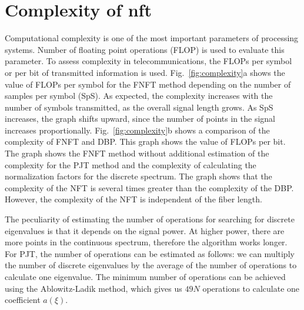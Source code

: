 \section{Complexity of \acrlong{nft}}


Computational complexity is one of the most important parameters of processing systems. Number of floating point operations (FLOP) is used to evaluate this parameter. To assess complexity in telecommunications, the FLOPs per symbol or per bit of transmitted information is used. Fig.~\ref{fig:complexity}a shows the value of FLOPs per symbol for the FNFT method depending on the number of samples per symbol (SpS). As expected, the complexity increases with the number of symbols transmitted, as the overall signal length grows. As SpS increases, the graph shifts upward, since the number of points in the signal increases proportionally. Fig.~\ref{fig:complexity}b shows a comparison of the complexity of FNFT and DBP. This graph shows the value of FLOPs per bit. The graph shows the FNFT method without additional estimation of the complexity for the PJT method and the complexity of calculating the normalization factors for the discrete spectrum.
The graph shows that the complexity of the NFT is several times greater than the complexity of the DBP. However, the complexity of the NFT is independent of the fiber length.

The peculiarity of estimating the number of operations for searching for discrete eigenvalues is that it depends on the signal power. At higher power, there are more points in the continuous spectrum, therefore the algorithm works longer. For PJT, the number of operations can be estimated as follows: we can multiply the number of discrete eigenvalues by the average of the number of operations to calculate one eigenvalue. The minimum number of operations can be achieved using the Ablowitz-Ladik method, which gives us $49 N$ operations to calculate one coefficient $a(\xi)$.

